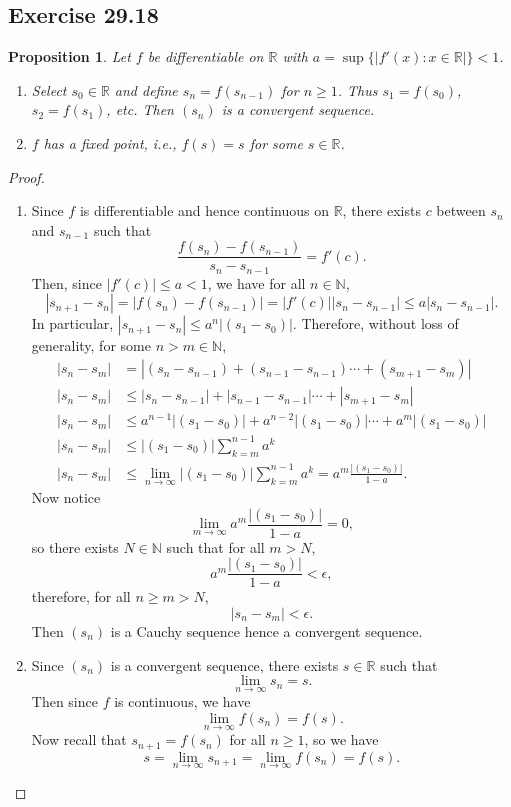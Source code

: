 \documentclass{article}
\newtheorem{proposition}[thm]{Proposition}
\newcommand*{\R}{\ensuremath{\mathbb{R}}}
\newcommand*{\N}{\ensuremath{\mathbb{N}}}
\begin{document}
\subsection*{Exercise 29.18}
\begin{proposition}
    Let $f$ be differentiable on $\R$ with $a=\sup\{|f'(x):x\in\R|\}<1$.
    \begin{enumerate}[label=\textbf{(\alph*)}]
        \item Select $s_0\in\R$ and define $s_n=f(s_{n-1})$ for $n\ge 1$. Thus $s_1=f(s_0)$,
        $s_2=f(s_1)$, etc. Then $(s_n)$ is a convergent sequence.

        \item $f$ has a fixed point, i.e., $f(s)=s$ for some $s\in\R$.
    \end{enumerate}
\end{proposition}
\begin{proof}
    \begin{enumerate}[label=\textbf{(\alph*)}]
        \item 
        Since $f$ is differentiable and hence continuous on $\R$, there exists $c$ between $s_n$ and $s_{n-1}$
        such that 
        $$\frac{f(s_n) - f(s_{n-1})}{s_n-s_{n-1}} = f'(c).$$
        Then, since $|f'(c)|\le a<1$, we have for all $n\in\N$,
        $$|s_{n+1}-s_n| = |f(s_n) - f(s_{n-1})| = |f'(c)||s_n-s_{n-1}| \le a|s_n-s_{n-1}|.$$
        In particular, $|s_{n+1}-s_n|\le a^n|(s_1-s_0)|.$ Therefore, without loss of generality, for some $n> m \in\N$, 
        \begin{align*}
            |s_n-s_m| & = |(s_n - s_{n-1}) + (s_{n-1} - s_{n-1})\cdots + (s_{m+1}-s_m)| \\
            |s_n-s_m| & \le |s_n-s_{n-1}| + |s_{n-1} - s_{n-1}|\cdots + |s_{m+1}-s_m| \\
            |s_n-s_m| & \le a^{n-1}|(s_1-s_0)| + a^{n-2}|(s_1-s_0)|\cdots + a^m|(s_1-s_0)| \\
            |s_n-s_m| & \le |(s_1-s_0)|\sum_{k=m}^{n-1}a^k \\
            |s_n-s_m| & \le \lim_{n\to\infty}|(s_1-s_0)|\sum_{k=m}^{n-1}a^k = a^m\frac{|(s_1-s_0)|}{1-a}.
        \end{align*}
        Now notice $$\lim_{m\to\infty}a^m\frac{|(s_1-s_0)|}{1-a} = 0,$$
        so there exists $N\in\N$ such that for all $m> N$, 
        $$a^m\frac{|(s_1-s_0)|}{1-a} < \epsilon,$$
        therefore, for all $n\ge m>N$,
        $$|s_n-s_m| < \epsilon.$$
        Then $(s_n)$ is a Cauchy sequence hence a convergent sequence.

        \item 
        Since $(s_n)$ is a convergent sequence, there exists $s\in\R$ such that
        $$\lim_{n\to\infty}s_n = s.$$
        Then since $f$ is continuous, we have
        $$\lim_{n\to\infty}f(s_n) = f(s).$$
        Now recall that $s_{n+1}=f(s_n)$ for all $n\ge 1$, so we have
        $$s = \lim_{n\to\infty}s_{n+1} = \lim_{n\to\infty}f(s_n) = f(s).$$
    \end{enumerate}
\end{proof}
\end{document}
